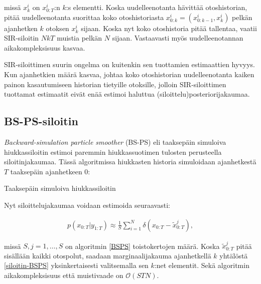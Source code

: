 \documentclass[
  12pt,
  a4paper, twoside]{book}
\begin{document}
missä \(x^i_k\) on \(x^i_{0:T}\):n \(k\):s elementti. Koska uudelleenotanta hävittää otoshistorian, pitää uudelleenotanta suorittaa koko otoshistoriasta \(x_{0:k}^i = (x_{0:k-1}^i, x_{k}^i)\) pelkän ajanhetken \(k\) otoksen \(x_{k}^i\) sijaan. Koska nyt koko otoshistoria pitää tallentaa, vaatii SIR-siloitin \(NkT\) muistia pelkän \(N\) sijaan. Vastaavasti myös uudelleenotannan aikakompleksisuus kasvaa. \citep{kitagawa-1996}

SIR-siloittimen suurin ongelma on kuitenkin sen tuottamien estimaattien hyvyys. Kun ajanhetkien määrä kasvaa, johtaa koko otoshistorian uudelleenotanta kaiken painon kasautumiseen historian tietyille otoksille, jolloin SIR-siloittimen tuottamat estimaatit eivät enää estimoi haluttua (siloittelu)posteriorijakaumaa. \citep{kitagawa-1996}

\subsection{BS-PS-siloitin}

\emph{Backward-simulation particle smoother} (BS-PS) eli taaksepäin simuloiva hiukkassiloitin estimoi paremmin hiukkassuotimen tulosten perusteella siloitinjakaumaa. Tässä algoritmissa hiukkasten historia simuloidaan ajanhetkestä \(T\) taaksepäin ajanhetkeen 0:

\begin{algorithm}[H]
\label{BSPS}
\DontPrintSemicolon
\SetAlgoShortEnd
{}
\caption{Taaksepäin simuloiva hiukkassiloitin}
\end{algorithm}

Nyt siloittelujakaumaa voidaan estimoida seuraavasti:

\begin{align}\label{siloitin-BSPS}
p(x_{0:T}|y_{1:T}) \approx \frac{1}{S} \sum_{i=1}^N \delta (x_{0:T}-\tilde{x}_{0:T}^j),
\end{align}

missä \(S, j=1,\ldots,S\) on algoritmin \ref{BSPS} toistokertojen määrä. Koska \(\tilde{x}_{0:T}^j\) pitää sisällään kaikki otospolut, saadaan marginaalijakauma ajanhetkellä \(k\) yhtälöstä \ref{siloitin-BSPS} yksinkertaisesti valitsemalla sen \(k\):net elementit. Sekä algoritmin aikakompleksisuus että muistivaade on \(\mathcal{O}(STN)\).
\end{document}
